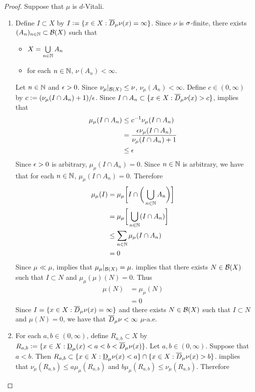 \documentclass{book}
\begin{document}
	\begin{proof} Suppose that $\mu$ is $d$-Vitali.
		\begin{enumerate}
			\item Define $I \subset X$ by $I \vcentcolon= \{x \in X: \overline{D}_{\mu}\nu(x) = \infty\}$. Since $\nu$ is $\sigma$-finite, there exists $(A_n)_{n \in \mathbb{N}} \subset \mathcal{B}(X)$ such that 
			\begin{itemize}
				\item $X = \bigcup\limits_{n \in \mathbb{N}} A_n$
				\item for each $n \in \mathbb{N}$, $\nu(A_n) < \infty$. 
			\end{itemize}
			Let $n \in \mathbb{N}$ and $\epsilon > 0$. Since $\nu_{\mu}|_{\mathcal{B}(X)} \leq \nu$, $\nu_{\mu}(A_n) < \infty$. Define $c \in (0, \infty)$ by $c \vcentcolon= (\nu_{\mu}(I \cap A_n) + 1) / \epsilon$. Since $I \cap A_n \subset \{x \in X: \overline{D}_{\mu}\nu(x) > c\}$,  implies that 
			\begin{align*}
				 \mu_{\mu}(I\cap A_n) 
				 & \leq c^{-1} \nu_{\mu}(I \cap A_n) \\
				 & = \frac{\epsilon \nu_{\mu}(I \cap A_n)}{\nu_{\mu}(I \cap A_n) + 1} \\
				 & \leq \epsilon 
			\end{align*}
			Since $\epsilon > 0$ is arbitrary, $\mu_{\mu}(I \cap A_n) = 0$. Since $n \in \mathbb{N}$ is arbitrary, we have that for each $n \in \mathbb{N}$, $\mu_{\mu}(I \cap A_n) = 0$. Therefore 
			\begin{align*}
				\mu_{\mu}(I)
				& = \mu_{\mu} \bigg[ I \cap \bigg( \bigcup_{n \in \mathbb{N}} A_n \bigg)  \bigg] \\
				& = \mu_{\mu} \bigg[ \bigcup_{n \in \mathbb{N}} (I \cap A_n)  \bigg] \\
				& \leq \sum\limits_{n \in \mathbb{N}} \mu_{\mu}(I \cap A_n) \\
				& = 0 
			\end{align*}
			Since $\mu \ll \mu$,  implies that $\mu_{\mu}|_{\mathcal{B}(X)} = \mu$.  implies that there exists $N \in \mathcal{B}(X)$ such that $I \subset N$ and $\mu_{\mu}(\mu)(N) = 0$. Thus
			\begin{align*}
				\mu(N)
				& = \mu_{\mu}(N) \\
				& = 0
			\end{align*}
			Since $I = \{x \in X: \overline{D}_{\mu}\nu(x) = \infty \}$ and there exists $N \in \mathcal{B}(X)$ such that $I \subset N$ and $\mu(N) = 0$, we have that $\overline{D}_{\mu}\nu < \infty$ $\mu$-a.e.
			\item For each $a,b \in (0, \infty)$, define $R_{a,b} \subset X$ by $R_{a,b} \vcentcolon= \{x \in X: \underbar{D}_{\mu}(x) < a < b < \overline{D}_{\mu} \nu (x)\}$. Let $a,b \in (0, \infty)$. Suppose that $a < b$. Then $R_{a,b} \subset \{x \in X: \underbar{D}_{\mu}\nu(x) < a\} \cap \{x \in X: \overline{D}_{\mu}\nu(x) > b\}$.  implies that $\nu_{\mu}(R_{a,b}) \leq a \mu_{\mu}(R_{a,b})$ and $b \mu_{\mu}(R_{a,b}) \leq \nu_{\mu}(R_{a,b})$. Therefore 

\end{enumerate}
\end{proof}
\end{document}
